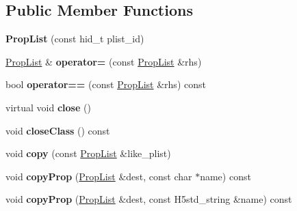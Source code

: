 \subsection*{Public Member Functions}
\begin{DoxyCompactItemize}
\item 
\mbox{\label{class_h5_1_1_prop_list_acd354e858c9ed4be9943bb3ff583a41e}} 
{\bfseries Prop\+List} (const hid\+\_\+t plist\+\_\+id)
\item 
\mbox{\label{class_h5_1_1_prop_list_a63ebb8bd80e75b004188a4adc0239e9a}} 
\hyperlink{class_h5_1_1_prop_list}{Prop\+List} \& {\bfseries operator=} (const \hyperlink{class_h5_1_1_prop_list}{Prop\+List} \&rhs)
\item 
\mbox{\label{class_h5_1_1_prop_list_a1ca098347ed5221de88f82830a1f7c72}} 
bool {\bfseries operator==} (const \hyperlink{class_h5_1_1_prop_list}{Prop\+List} \&rhs) const
\item 
\mbox{\label{class_h5_1_1_prop_list_a4c3edf6de6770d32a27bc0c39efb6ee5}} 
virtual void {\bfseries close} ()
\item 
\mbox{\label{class_h5_1_1_prop_list_ab7dd04ecd6353aa9a4abd812ac39bc5e}} 
void {\bfseries close\+Class} () const
\item 
\mbox{\label{class_h5_1_1_prop_list_a7ddaf55c2144f91013ced20f9139de74}} 
void {\bfseries copy} (const \hyperlink{class_h5_1_1_prop_list}{Prop\+List} \&like\+\_\+plist)
\item 
\mbox{\label{class_h5_1_1_prop_list_ab6692af209e868d867d38d15b7e6ba2b}} 
void {\bfseries copy\+Prop} (\hyperlink{class_h5_1_1_prop_list}{Prop\+List} \&dest, const char $\ast$name) const
\item 
\mbox{\label{class_h5_1_1_prop_list_a806af10434d78f9da162c11280a91e94}} 
void {\bfseries copy\+Prop} (\hyperlink{class_h5_1_1_prop_list}{Prop\+List} \&dest, const H5std\+\_\+string \&name) const
\item 
\mbox{\label{class_h5_1_1_prop_list_a0b56558b90895a135b51f48152b179f9}} 

\end{DoxyCompactItemize}
